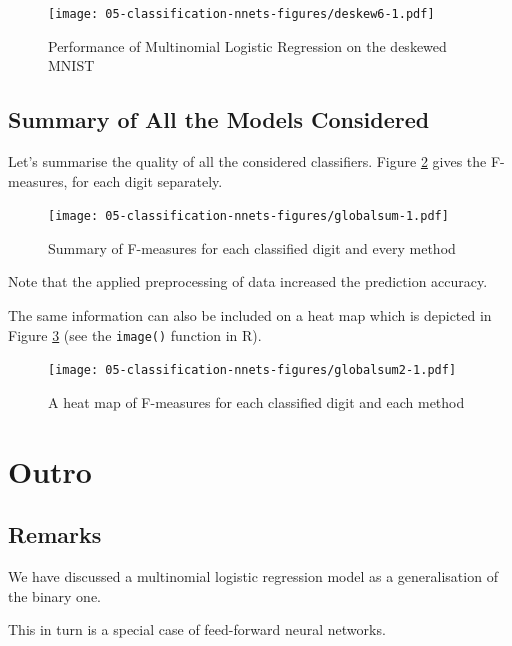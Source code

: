 \documentclass[10pt,b5paper,krantz1]{krantz}
\begin{document}
\begin{figure}
\hypertarget{fig:deskew6}{%
\centering
\texttt{[image: 05-classification-nnets-figures/deskew6-1.pdf]}
\caption{Performance of Multinomial Logistic Regression on the deskewed MNIST}\label{fig:deskew6}
}
\end{figure}

\hypertarget{summary-of-all-the-models-considered}{%
\subsection{Summary of All the Models Considered}\label{summary-of-all-the-models-considered}}

Let's summarise the quality of all the considered classifiers.
Figure \ref{fig:globalsum} gives the F-measures, for each digit
separately.

\begin{figure}
\hypertarget{fig:globalsum}{%
\centering
\texttt{[image: 05-classification-nnets-figures/globalsum-1.pdf]}
\caption{Summary of F-measures for each classified digit and every method}\label{fig:globalsum}
}
\end{figure}

Note that the applied preprocessing of data increased
the prediction accuracy.

The same information can also be included on a heat map
which is depicted in Figure \ref{fig:globalsum2}
(see the \texttt{image()} function in R).

\begin{figure}
\hypertarget{fig:globalsum2}{%
\centering
\texttt{[image: 05-classification-nnets-figures/globalsum2-1.pdf]}
\caption{A heat map of F-measures for each classified digit and each method}\label{fig:globalsum2}
}
\end{figure}

\hypertarget{outro-4}{%
\section{Outro}\label{outro-4}}

\hypertarget{remarks-4}{%
\subsection{Remarks}\label{remarks-4}}

We have discussed a multinomial logistic regression model
as a generalisation of the binary one.

This in turn is a special case of feed-forward neural networks.
\end{document}
